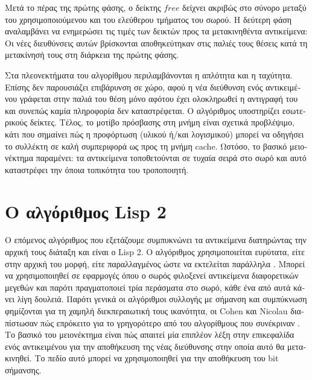 \begin{greek}
Μετά το πέρας της πρώτης φάσης, ο δείκτης $free$ δείχνει ακριβώς στο σύνορο μεταξύ του 
χρησιμοποιούμενου και του ελεύθερου τμήματος του σωρού. Η δεύτερη φάση αναλαμβάνει να 
ενημερώσει τις τιμές των δεικτών προς τα μετακινηθέντα αντικείμενα: Οι νέες διευθύνσεις 
αυτών βρίσκονται αποθηκεύτηκαν στις παλιές τους θέσεις κατά τη μετακίνησή τους στη 
διάρκεια της πρώτης φάσης.

Στα πλεονεκτήματα του αλγορίθμου περιλαμβάνονται η απλότητα και η ταχύτητα. Επίσης δεν 
παρουσιάζει επιβάρυνση σε χώρο, αφού η νέα διεύθυνση ενός αντικειμένου γράφεται στην παλιά 
του θέση μόνο αφότου έχει ολοκληρωθεί η αντιγραφή του και συνεπώς καμία πληροφορία δεν 
καταστρέφεται. Ο αλγόριθμος υποστηρίζει εσωτερικούς δείκτες. Τέλος, το μοτίβο πρόσβασης 
στη μνήμη είναι σχετικά προβλέψιμο, κάτι που σημαίνει πώς η προφόρτωση (υλικού ή/και 
λογισμικού) μπορεί να οδηγήσει το συλλέκτη σε καλή συμπεριφορά ως προς τη μνήμη cache. 
Ωστόσο, το βασικό μειονέκτημα παραμένει: τα αντικείμενα τοποθετούνται σε τυχαία σειρά στο 
σωρό και αυτό καταστρέφει την όποια τοπικότητα του τροποποιητή.

\section{Ο αλγόριθμος Lisp 2}
Ο επόμενος αλγόριθμος που εξετάζουμε συμπυκνώνει τα αντικείμενα διατηρώντας την αρχική 
τους διάταξη και είναι ο Lisp 2. Ο αλγόριθμος χρησιμοποιείται ευρύτατα, είτε στην αρχική 
του μορφή, είτε παραλλαγμένος ώστε να εκτελείται παράλληλα \cite{DBLP:conf/jvm/FloodDSZ01}. 
Μπορεί να χρησιμοποιηθεί σε εφαρμογές όπου ο σωρός φιλοξενεί αντικείμενα διαφορετικών 
μεγεθών και παρότι πραγματοποιεί τρία περάσματα στο σωρό, κάθε ένα από αυτά κάνει λίγη 
δουλειά. Παρότι γενικά οι αλγόριθμοι συλλογής με σήμανση και συμπύκνωση φημίζονται για τη 
χαμηλή διεκπεραιωτική τους ικανότητα, οι Cohen και Nicolau \cite{DBLP:journals/toplas/CohenN83}
διαπίστωσαν πώς επρόκειτο για το γρηγορότερο από του αλγορίθμους που συνέκριναν .
Το βασικό του μειονέκτημα είναι πώς απαιτεί μία επιπλέον λέξη στην επικεφαλίδα ενός 
αντικειμένου για την αποθήκευση της νέας διεύθυνσης στην οποία αυτό θα μετακινηθεί. Το 
πεδίο αυτό μπορεί να χρησιμοποιηθεί για την αποθήκευση του bit σήμανσης.


\end{greek}
